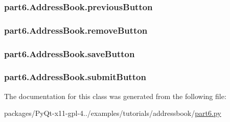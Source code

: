 \subsubsection[{previous\+Button}]{\setlength{\rightskip}{0pt plus 5cm}part6.\+Address\+Book.\+previous\+Button}\label{classpart6_1_1AddressBook_a4984b1305b40ce42ab423723cf549ed9}
\hypertarget{classpart6_1_1AddressBook_a1d4cfe2106796afd0eca44947cb92ad1}{}
\subsubsection[{remove\+Button}]{\setlength{\rightskip}{0pt plus 5cm}part6.\+Address\+Book.\+remove\+Button}\label{classpart6_1_1AddressBook_a1d4cfe2106796afd0eca44947cb92ad1}
\hypertarget{classpart6_1_1AddressBook_ae52e3150726e653dd684992f13e5d632}{}
\subsubsection[{save\+Button}]{\setlength{\rightskip}{0pt plus 5cm}part6.\+Address\+Book.\+save\+Button}\label{classpart6_1_1AddressBook_ae52e3150726e653dd684992f13e5d632}
\hypertarget{classpart6_1_1AddressBook_a7a21f06d4613f0833e5bfc904f984392}{}
\subsubsection[{submit\+Button}]{\setlength{\rightskip}{0pt plus 5cm}part6.\+Address\+Book.\+submit\+Button}\label{classpart6_1_1AddressBook_a7a21f06d4613f0833e5bfc904f984392}


The documentation for this class was generated from the following file\+:\begin{DoxyCompactItemize}
\item 
packages/\+Py\+Qt-\/x11-\/gpl-\/4../examples/tutorials/addressbook/\hyperlink{part6_8py}{part6.\+py}\end{DoxyCompactItemize}
